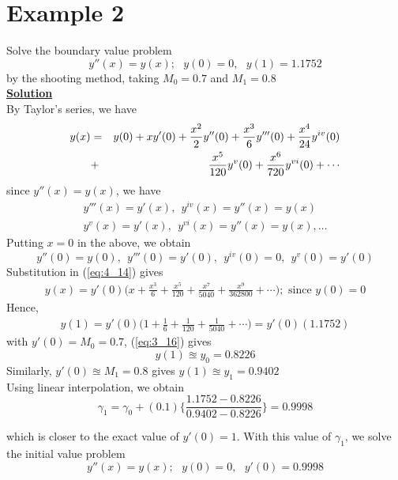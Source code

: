 \documentclass[12pt]{report}
\newcommand{\ubt}[1]{\textbf{\underline{#1}}}
\newcommand{\sps}{\\[0.2cm]}
\newcommand{\refn}[1]{(\ref{#1})}
\newcommand{\refx}[1]{\refn{eq:#1}}
\newcommand{\NI}{\noindent}
\newcommand{\sprime}{'}
\newcommand{\dprime}{''}
\newcommand{\tprime}{'''}
\begin{document}
	\section*{Example 2}
	Solve the boundary value problem
	$$
		y\dprime(x) = y(x); ~~~ y(0) = 0, ~~~ y(1) = 1.1752
	$$
	by the shooting method, taking $M_0 = 0.7$ and $M_1 = 0.8$\sps
	\newpage
	\NI\ubt{Solution}\sps
	By Taylor's series, we have
	\begin{eqnarray}
		y(x) &=& y(0) + xy\sprime(0) + \frac{x^2}{2}y\dprime(0) + \frac{x^3}{6}y\tprime(0) + \frac{x^4}{24}y^{iv}(0) \notag\\
		&+& \frac{x^5}{120}y^v(0) + \frac{x^6}{720}y^{vi}(0) + \cdots \label{eq:4_14} 
	\end{eqnarray}
	since $y\dprime(x) = y(x)$, we have
	\begin{equation*}
		\begin{array}{c}
			y\tprime(x) = y\sprime(x), ~~y^{iv}(x) = y\dprime(x) = y(x)~~~~\\
			y^{v}(x) = y\sprime(x), ~~y^{vi}(x) = y\dprime(x) = y(x), \ldots
		\end{array}
	\end{equation*}
	Putting $x=0$ in the above, we obtain
	$$
		y\dprime(0) = y(0), ~~ y\tprime(0) = y\sprime(0), ~~y^{iv}(0) = 0, ~~ y^{v}(0) = y\sprime(0) 
	$$
	Substitution in \refx{4_14} gives
	\begin{eqnarray}
		y(x) = y\sprime(0)\Big(x + \frac{x^3}{6} + \frac{x^5}{120}+ \frac{x^7}{5040} + \frac{x^9}{362800} + \cdots\Big); \text{ since } y(0) = 0\label{eq:4_15}
	\end{eqnarray}
	Hence,
	\begin{eqnarray}
		y(1) = y\sprime(0)\Big(1 + \frac{1}{6} + \frac{1}{120}+ \frac{1}{5040} + \cdots\Big)  = y'(0)(1.1752)\label{eq:4_16}
	\end{eqnarray}
	with $y\sprime(0) = M_0 = 0.7$, \refx{3_16} gives
	\begin{equation*}
		y(1) \approxeq y_0 = 0.8226
	\end{equation*}
	Similarly, $y\sprime(0) \approxeq M_1 = 0.8$ gives $y(1)\approxeq y_1 = 0.9402$\sps
	Using linear interpolation, we obtain
	\begin{equation*}
		\gamma_1 = \gamma_0 + (0.1) \Big\{\frac{1.1752 - 0.8226}{0.9402 - 0.8226}\Big\} = 0.9998
	\end{equation*}
	
	\NI which is closer to the exact value of $y\sprime(0) = 1$. With this value of $\gamma_1$, we solve the initial value problem
	\begin{equation*}
		y\dprime(x) = y(x); ~~~ y(0) = 0, ~~~ y\sprime(0) = 0.9998
	\end{equation*}
	
\end{document}

